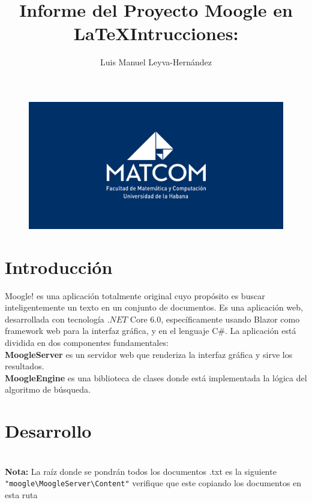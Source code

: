 \documentclass{article}
\title{Informe del Proyecto Moogle en \LaTeX}
\author{Luis Manuel Leyva-Hernández}
\begin{document}
\begin{figure}
    \centering
    \includegraphics[width=\textwidth]{87f4e980-62a6-11eb-846f-4c58547cffc0.png}
    \label{main-img}
\end{figure}
\maketitle
{}
\section*{Introducción}

Moogle! es una aplicación totalmente original cuyo propósito es buscar inteligentemente un texto en un conjunto de documentos. Es una aplicación web, desarrollada con tecnología $.NET$ Core 6.0, específicamente usando Blazor como framework web para la interfaz gráfica, y en el lenguaje C\#. La aplicación está dividida en dos componentes fundamentales:\\

\textbf{MoogleServer} es un servidor web que renderiza la interfaz gráfica y sirve los resultados.\\

\textbf{MoogleEngine} es una biblioteca de clases donde está implementada la lógica del algoritmo de búsqueda.\\

\section*{Desarrollo}

\title{\textbf{Intrucciones:}}\\


    \scriptsize \textbf{Nota:} La raíz donde se pondrán todos los documentos .txt es la siguiente \verb*|"moogle\MoogleServer\Content"| verifique que este copiando los documentos en esta ruta\\
\end{document}
